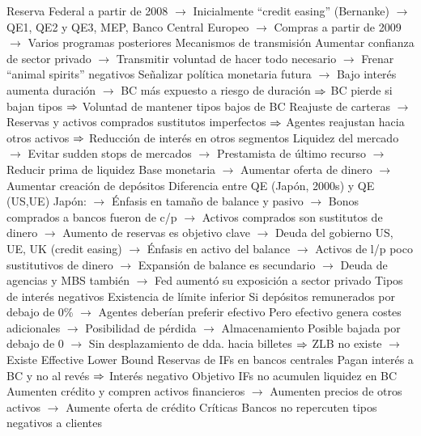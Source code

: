 \documentclass{nuevotema}
\begin{document}
\begin{esquemal}
				\4[] Reserva Federal a partir de 2008
				\4[] $\to$ Inicialmente ``credit easing'' (Bernanke)
				\4[] $\to$ QE1, QE2 y QE3, MEP,
				\4[] Banco Central Europeo
				\4[] $\to$ Compras a partir de 2009
				\4[] $\to$ Varios programas posteriores
				\4 Mecanismos de transmisión
				\4[] Aumentar confianza de sector privado
				\4[] $\to$ Transmitir voluntad de hacer todo necesario
				\4[] $\to$ Frenar ``animal spirits'' negativos
				\4[] Señalizar política monetaria futura
				\4[] $\to$ Bajo interés aumenta duración
				\4[] $\to$ BC más expuesto a riesgo de duración
				\4[] $\Rightarrow$ BC pierde si bajan tipos
				\4[] $\Rightarrow$ Voluntad de mantener tipos bajos de BC
				\4[] Reajuste de carteras
				\4[] $\to$ Reservas y activos comprados sustitutos imperfectos
				\4[] $\Rightarrow$ Agentes reajustan hacia otros activos
				\4[] $\Rightarrow$ Reducción de interés en otros segmentos
				\4[] Liquidez del mercado
				\4[] $\to$ Evitar sudden stops de mercados
				\4[] $\to$ Prestamista de último recurso
				\4[] $\to$ Reducir prima de liquidez
				\4[] Base monetaria
				\4[] $\to$ Aumentar oferta de dinero
				\4[] $\to$ Aumentar creación de depósitos
				\4 Diferencia entre QE (Japón, 2000s) y QE (US,UE)
				\4[] Japón:
				\4[] $\to$ Énfasis en tamaño de balance y pasivo
				\4[] $\to$ Bonos comprados a bancos fueron de c/p
				\4[] $\to$ Activos comprados son sustitutos de dinero
				\4[] $\to$ Aumento de reservas es objetivo clave
				\4[] $\to$ Deuda del gobierno
				\4[] US, UE, UK (credit easing)
				\4[] $\to$ Énfasis en activo del balance
				\4[] $\to$ Activos de l/p poco sustitutivos de dinero
				\4[] $\to$ Expansión de balance es secundario
				\4[] $\to$ Deuda de agencias y MBS también
				\4[] $\to$ Fed aumentó su exposición a sector privado
			\3 Tipos de interés negativos
				\4 Existencia de límite inferior
				\4[] Si depósitos remunerados por debajo de 0\%
				\4[] $\to$ Agentes deberían preferir efectivo
				\4[] Pero efectivo genera costes adicionales
				\4[] $\to$ Posibilidad de pérdida
				\4[] $\to$ Almacenamiento
				\4[] Posible bajada por debajo de 0
				\4[] $\to$ Sin desplazamiento de dda. hacia billetes
				\4[] $\Rightarrow$ ZLB no existe $\to$ Existe Effective Lower Bound
				\4 Reservas de IFs en bancos centrales
				\4[] Pagan interés a BC y no al revés
				\4[] $\Rightarrow$ Interés negativo
				\4 Objetivo
				\4[] IFs no acumulen liquidez en BC
				\4[] Aumenten crédito y compren activos financieros
				\4[] $\to$ Aumenten precios de otros activos
				\4[] $\to$ Aumente oferta de crédito
				\4 Críticas
				\4[] Bancos no repercuten tipos negativos a clientes

\end{esquemal}
\end{document}
